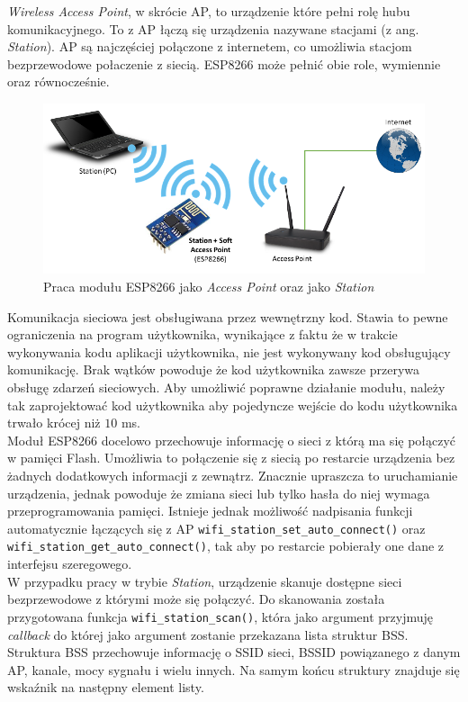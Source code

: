 \textit{Wireless Access Point}, w skrócie AP, to urządzenie które pełni rolę 
hubu komunikacyjnego.  To z AP łączą się urządzenia nazywane stacjami (z ang. \textit{Station}).
AP są najczęściej połączone z internetem, co umożliwia stacjom
bezprzewodowe połaczenie z siecią. ESP8266 może pełnić obie role, wymiennie oraz równocześnie.\\

\begin{figure}[H]
	\centering
    \includegraphics[width=12cm]{./images/WiFi-stationap-mode.png}
    \caption{Praca modułu ESP8266 jako \textit{Access Point} oraz jako \textit{Station}}
    \label{ap+station}
\end{figure}


Komunikacja sieciowa jest obsługiwana przez wewnętrzny kod. Stawia to pewne ograniczenia 
na program użytkownika, wynikające z faktu że w trakcie wykonywania kodu aplikacji 
użytkownika, nie jest wykonywany kod obsługujący komunikację. Brak wątków powoduje że 
kod użytkownika zawsze przerywa obsługę zdarzeń sieciowych. Aby umożliwić poprawne działanie
modułu, należy tak zaprojektować kod użytkownika aby pojedyncze wejście do kodu użytkownika
trwało krócej niż $\num{10}$ ms.\\


Moduł ESP8266 docelowo przechowuje informację o sieci z którą ma się połączyć w pamięci Flash.
Umożliwia to połączenie się z siecią po restarcie urządzenia bez żadnych dodatkowych informacji 
z zewnątrz. Znacznie upraszcza to uruchamianie urządzenia, jednak powoduje że zmiana sieci 
lub tylko hasła do niej wymaga przeprogramowania pamięci. Istnieje jednak możliwość 
nadpisania funkcji automatycznie łączących się z AP \verb+wifi_station_set_auto_connect()+ oraz 
\verb+wifi_station_get_auto_connect()+, tak aby po restarcie pobierały one dane z interfejsu szeregowego.\\

W przypadku pracy w trybie \textit{Station}, urządzenie skanuje dostępne sieci
bezprzewodowe z którymi może się połączyć. Do skanowania została przygotowana 
funkcja \verb+wifi_station_scan()+, która jako argument przyjmuję \textit{callback}
do której jako argument zostanie przekazana lista struktur BSS. Struktura BSS
przechowuje informację o SSID sieci, BSSID powiązanego z danym AP, kanale, mocy
sygnału i wielu innych. Na samym końcu struktury znajduje się wskaźnik na następny 
element listy.\\


